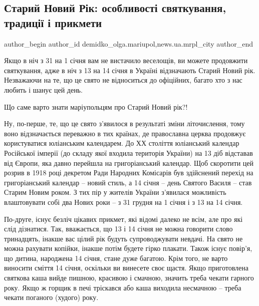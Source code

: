 
 
 
 
 
 
\subsection{Старий Новий Рік: особливості святкування, традиції і прикмети}
\label{sec:13_01_2018.stz.news.ua.mrpl_city.1.staryj_novyj_rik}
 
\ifcmt
 author_begin
   author_id demidko_olga.mariupol,news.ua.mrpl_city
 author_end
\fi

Якщо в ніч з 31 на 1 січня вам не вистачило веселощів, ви можете продовжити
святкування, адже в ніч з 13 на 14 січня в Україні відзначають Старий Новий
рік. Незважаючи на те, що це свято не відноситься до офіційних, багато хто з
нас любить і шанує цей день.

Що саме варто знати маріупольцям про Старий Новий рік?!

Ну, по-перше, те, що це свято з'явилося в результаті зміни літочислення, тому
воно відзначається переважно в тих країнах, де православна церква продовжує
користуватися юліанським календарем. До ХХ століття юліанський календар
Російської імперії (до складу якої входила територія України) на 13 діб
відставав від Європи, яка давно перейшла на григоріанський календар. Щоб
скоротити цей розрив в 1918 році декретом Ради Народних Комісарів був
здійснений перехід на григоріанський календар – новий стиль, а 14 січня – день
Святого Василя – став Старим Новим роком. З тих пір у жителів України з'явилася
можливість влаштовувати собі два Нових роки – з 31 грудня на 1 січня і з 13 на
14 січня.

По-друге, існує безліч цікавих прикмет, які відомі далеко не всім, але про які
слід дізнатися. Так, вважається, що 13 і 14 січня не можна говорити слово
тринадцять, інакше вас цілий рік будуть супроводжувати невдачі. На свято не
можна рахувати копійки, інакше потім будете гірко плакати. Також існує повір'я,
що дитина, народжена 14 січня, стане дуже багатою. Крім того, не варто виносити
сміття 14 січня, оскільки ви винесете своє щастя. Якщо приготовлена святкова
каша вийде пишною, красивою і смачною, значить треба чекати гарного року. Якщо
ж горщик в печі тріскався або каша виходила несмачною – треба чекати поганого
(худого) року.


